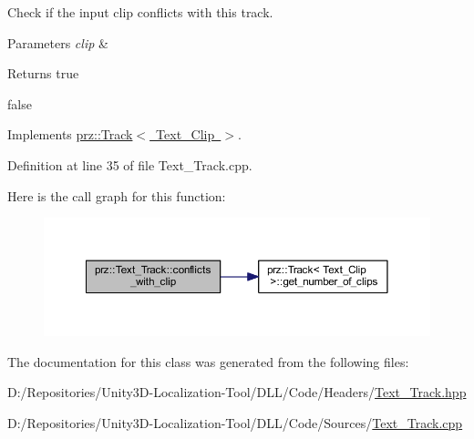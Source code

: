 Check if the input clip conflicts with this track. 


\begin{DoxyParams}{Parameters}
{\em clip} & \\
\hline
\end{DoxyParams}
\begin{DoxyReturn}{Returns}
true 

false 
\end{DoxyReturn}


Implements \mbox{\hyperlink{classprz_1_1_track_aefad1eca406d312dbafec624435b4420}{prz\+::\+Track$<$ Text\+\_\+\+Clip $>$}}.



Definition at line 35 of file Text\+\_\+\+Track.\+cpp.

Here is the call graph for this function\+:
\nopagebreak
\begin{figure}[H]
\begin{center}
\leavevmode
\includegraphics[width=350pt]{classprz_1_1_text___track_af19070ff05eb7922539baa043441145c_cgraph}
\end{center}
\end{figure}


The documentation for this class was generated from the following files\+:\begin{DoxyCompactItemize}
\item 
D\+:/\+Repositories/\+Unity3\+D-\/\+Localization-\/\+Tool/\+D\+L\+L/\+Code/\+Headers/\mbox{\hyperlink{_text___track_8hpp}{Text\+\_\+\+Track.\+hpp}}\item 
D\+:/\+Repositories/\+Unity3\+D-\/\+Localization-\/\+Tool/\+D\+L\+L/\+Code/\+Sources/\mbox{\hyperlink{_text___track_8cpp}{Text\+\_\+\+Track.\+cpp}}\end{DoxyCompactItemize}
